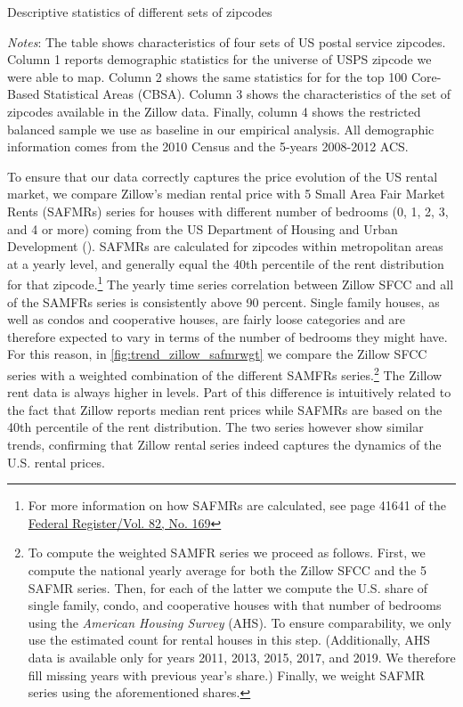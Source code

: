 \begin{table}[h!]
	\caption{Descriptive statistics of different sets of zipcodes}
	\centering
	\label{tab:desc_stats}    
	
	\begin{minipage}{0.95\textwidth} \footnotesize
		\vspace{3mm} 
		\textit{Notes}: The table shows characteristics of four sets of US postal service zipcodes.
		Column 1 reports demographic statistics for the universe of USPS zipcode we were able to 
		map. Column 2 shows the same statistics for for the top 100 Core-Based Statistical Areas 
		(CBSA). Column 3 shows the characteristics of the set of zipcodes available in the Zillow 
		data. Finally, column 4 shows the restricted balanced sample we use as baseline in our 
		empirical analysis. All demographic information comes from the 2010 Census and the 5-years 
		2008-2012 ACS.
	\end{minipage}
\end{table}

To ensure that our data correctly captures the price evolution of the US rental market, we compare 
Zillow's median rental price with 5 Small Area Fair Market Rents (SAFMRs) series for houses with 
different number of bedrooms (0, 1, 2, 3, and 4 or more) coming from the US Department of Housing 
and Urban Development (\citeyear{hud}). SAFMRs are calculated for zipcodes within metropolitan areas 
at a yearly level, and generally equal the 40th percentile of the rent distribution for that 
zipcode.\footnote{For more information on how SAFMRs are calculated, see page 41641 of the 
	\href{https://www.huduser.gov/portal/datasets/fmr/fmr2018/FY2018-FMR-Preamble.pdf}
	{Federal Register/Vol. 82, No. 169}} %
The yearly time series correlation between Zillow SFCC and all of the SAMFRs series is consistently 
above 90 percent. Single family houses, as well as condos and cooperative houses, are fairly loose 
categories and are therefore expected to vary in terms of the number of bedrooms they might have. 
For this reason, in \autoref{fig:trend_zillow_safmrwgt} we compare the Zillow SFCC series with a 
weighted combination of the different SAMFRs series.\footnote{\label{foot:zillow_time_series}
	To compute the weighted SAMFR series we proceed as follows. First, we compute the national yearly 
	average for both the Zillow SFCC and the 5 	SAFMR series. Then, for each of the latter we compute 
	the U.S. share of single family, condo, and cooperative houses with that number of bedrooms using 
	the \textit{American Housing Survey} (AHS). To ensure comparability, we only use the estimated 
	count for rental houses in this step. 	(Additionally, AHS data is available only for years 2011, 
	2013, 2015, 2017, and 2019. We therefore fill missing years with previous year's share.) Finally, 
	we weight SAFMR series using the aforementioned shares.} 
The Zillow rent data is always higher in levels. Part of this difference is intuitively related to the 
fact that Zillow reports median rent prices while SAFMRs are based on the 40th percentile of the rent 
distribution. The two series however show similar trends, confirming that Zillow rental series indeed 
captures the dynamics of the U.S. rental prices.

